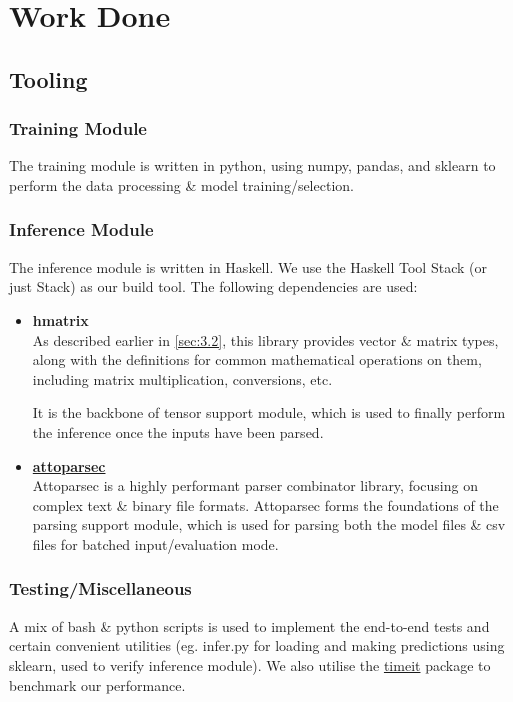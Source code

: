 \documentclass[12pt, titlepage]{article}
\begin{document}
\section{Work Done}
\subsection{Tooling}
\subsubsection{Training Module}
The training module is written in python, using numpy, pandas, and sklearn to perform the data processing \& model training/selection.\bigskip

\subsubsection{Inference Module}
The inference module is written in Haskell. We use the Haskell Tool Stack (or just Stack) as our build tool. The following dependencies are used:
\begin{itemize}
	\item \textbf{hmatrix}\\
	As described earlier in \ref{sec:3.2}, this library provides vector \& matrix types, along with the definitions for common mathematical operations on them, including matrix multiplication, conversions, etc.\bigskip

	It is the backbone of tensor support module, which is used to finally perform the inference once the inputs have been parsed.

	\item \textbf{\href{https://hackage.haskell.org/package/attoparsec}{attoparsec}}\\
	Attoparsec is a highly performant parser combinator library, focusing on complex text \& binary file formats. Attoparsec forms the foundations of the parsing support module, which is used for parsing both the model files \& csv files for batched input/evaluation mode.
\end{itemize}

\subsubsection{Testing/Miscellaneous}
A mix of bash \& python scripts is used to implement the end-to-end tests and certain convenient utilities (eg. infer.py for loading and making predictions using sklearn, used to verify inference module). We also utilise the \href{https://hackage.haskell.org/package/timeit}{timeit} package to benchmark our performance.
\end{document}
